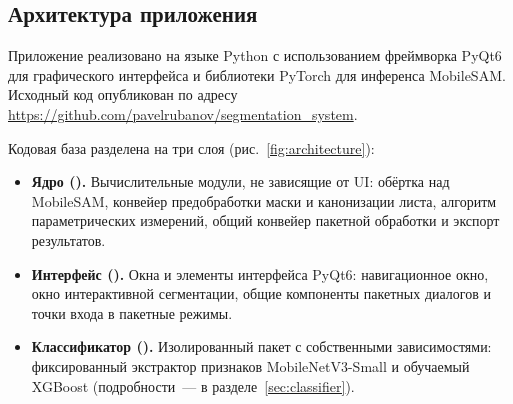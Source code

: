 \subsection{Архитектура приложения}
\label{sec:architecture}

Приложение реализовано на языке Python с использованием фреймворка PyQt6 для графического
интерфейса и библиотеки PyTorch для инференса MobileSAM. Исходный код опубликован по адресу
\url{https://github.com/pavelrubanov/segmentation_system}.

Кодовая база разделена на три слоя (рис.~\ref{fig:architecture}):

\begin{itemize}
    \item \textbf{Ядро ().} Вычислительные модули, не зависящие от UI:
          обёртка над MobileSAM, конвейер предобработки маски и канонизации листа,
          алгоритм параметрических измерений, общий конвейер пакетной обработки
          и экспорт результатов.
    \item \textbf{Интерфейс ().} Окна и элементы интерфейса PyQt6:
          навигационное окно, окно интерактивной сегментации, общие компоненты
          пакетных диалогов и точки входа в пакетные режимы.
    \item \textbf{Классификатор ().} Изолированный пакет с собственными
          зависимостями: фиксированный экстрактор признаков MobileNetV3-Small и
          обучаемый XGBoost (подробности~--- в разделе~\ref{sec:classifier}).
\end{itemize}

